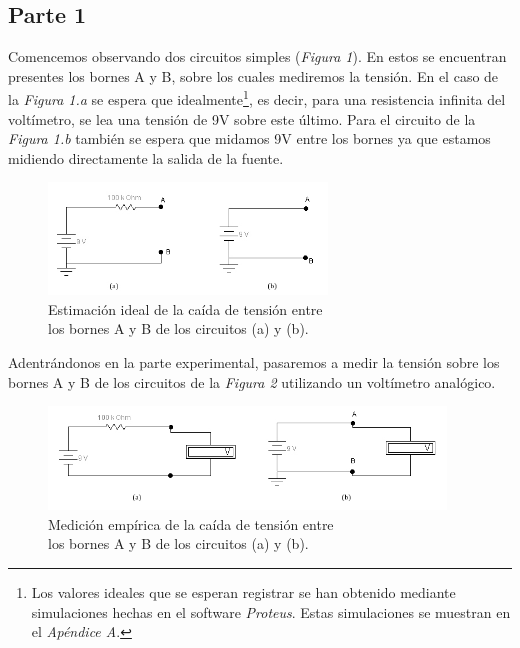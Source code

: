 \documentclass{article}
\begin{document}
\subsection{Parte 1}

	Comencemos observando dos circuitos simples (\textit{Figura 1}). En estos se encuentran presentes los bornes A y B, sobre los cuales mediremos la tensión. En el caso de la \textit{Figura 1.a} se espera que idealmente\footnote{Los valores ideales que se esperan registrar se han obtenido mediante simulaciones hechas en el software \textit{Proteus}. Estas simulaciones se muestran en el \textit{Apéndice A}.}, es decir, para una resistencia infinita del voltímetro, se lea una tensión de 9V sobre este último. Para el circuito de la \textit{Figura 1.b} también se espera que midamos 9V entre los bornes ya que estamos midiendo directamente la salida de la fuente.
\medskip

\begin{figure}[h]
	\centering
	\includegraphics[width=0.66\textwidth]{images/p1-item-1.jpg}
	\caption{Estimación ideal de la caída de tensión entre\\ los bornes A y B de los circuitos (a) y (b).}
\end{figure}
\bigskip


	Adentrándonos en la parte experimental, pasaremos a medir la tensión sobre los bornes A y B de los circuitos de la \textit{Figura 2} utilizando un voltímetro analógico.
\bigskip

\begin{figure}[h]
	\centering
	\includegraphics[width=0.94\textwidth]{images/p1-item-2.jpg}
	\caption{Medición empírica de la caída de tensión entre\\ los bornes A y B de los circuitos (a) y (b).}
\end{figure}
\bigskip
\end{document}
